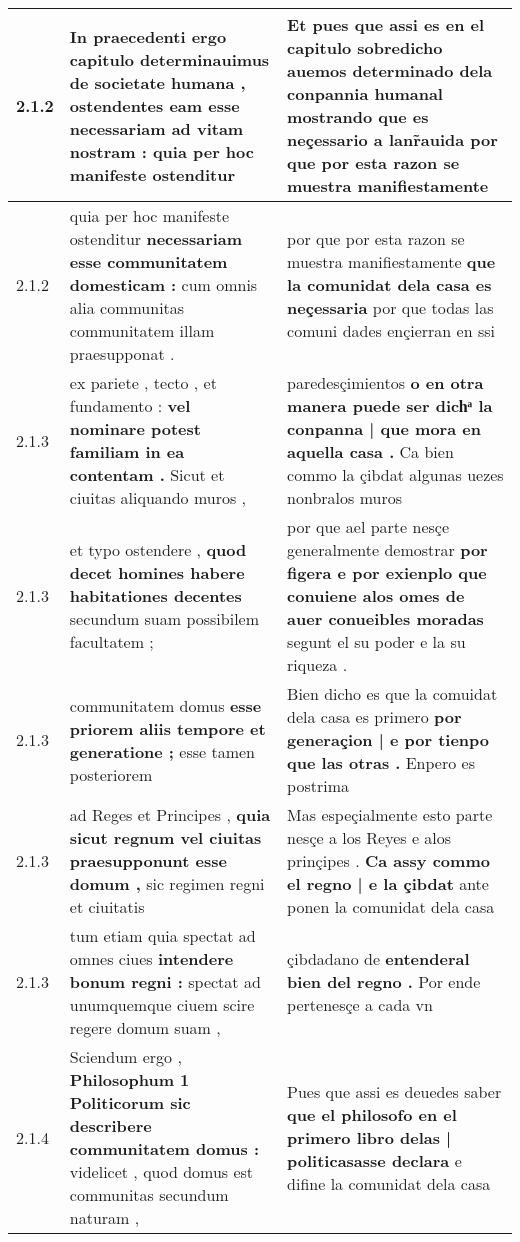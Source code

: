 \begin{tabular}{|p{1cm}|p{6.5cm}|p{6.5cm}|}
2.1.2 & In praecedenti ergo capitulo determinauimus de societate humana , \textbf{ ostendentes eam esse necessariam ad vitam nostram : } quia per hoc manifeste ostenditur & Et pues que assi es en el capitulo sobredicho auemos determinado dela conpannia humanal \textbf{ mostrando que es neçessario a lanr̃auida } por que por esta razon se muestra manifiestamente \\\hline
2.1.2 & quia per hoc manifeste ostenditur \textbf{ necessariam esse communitatem domesticam : } cum omnis alia communitas communitatem illam praesupponat . & por que por esta razon se muestra manifiestamente \textbf{ que la comunidat dela casa es neçessaria } por que todas las comuni dades ençierran en ssi \\\hline
2.1.3 & ex pariete , tecto , et fundamento : \textbf{ vel nominare potest familiam in ea contentam . } Sicut et ciuitas aliquando muros , & paredesçimientos \textbf{ o en otra manera puede ser dichͣ la conpanna | que mora en aquella casa . } Ca bien commo la çibdat algunas uezes nonbralos muros \\\hline
2.1.3 & et typo ostendere , \textbf{ quod decet homines habere habitationes decentes } secundum suam possibilem facultatem ; & por que ael parte nesçe generalmente demostrar \textbf{ por figera e por exienplo que conuiene alos omes de auer conueibles moradas } segunt el su poder e la su riqueza . \\\hline
2.1.3 & communitatem domus \textbf{ esse priorem aliis tempore et generatione ; } esse tamen posteriorem & Bien dicho es que la comuidat dela casa es primero \textbf{ por generaçion | e por tienpo que las otras . } Enpero es postrima \\\hline
2.1.3 & ad Reges et Principes , \textbf{ quia sicut regnum vel ciuitas praesupponunt esse domum , } sic regimen regni et ciuitatis & Mas espeçialmente esto parte nesçe a los Reyes e alos prinçipes . \textbf{ Ca assy commo el regno | e la çibdat } ante ponen la comunidat dela casa \\\hline
2.1.3 & tum etiam quia spectat ad omnes ciues \textbf{ intendere bonum regni : } spectat ad unumquemque ciuem scire regere domum suam , & çibdadano de \textbf{ entenderal bien del regno . } Por ende pertenesçe a cada vn \\\hline
2.1.4 & Sciendum ergo , \textbf{ Philosophum 1 Politicorum sic describere communitatem domus : } videlicet , quod domus est communitas secundum naturam , & Pues que assi es deuedes saber \textbf{ que el philosofo en el primero libro delas | politicasasse declara } e difine la comunidat dela casa \\\hline

\end{tabular}
